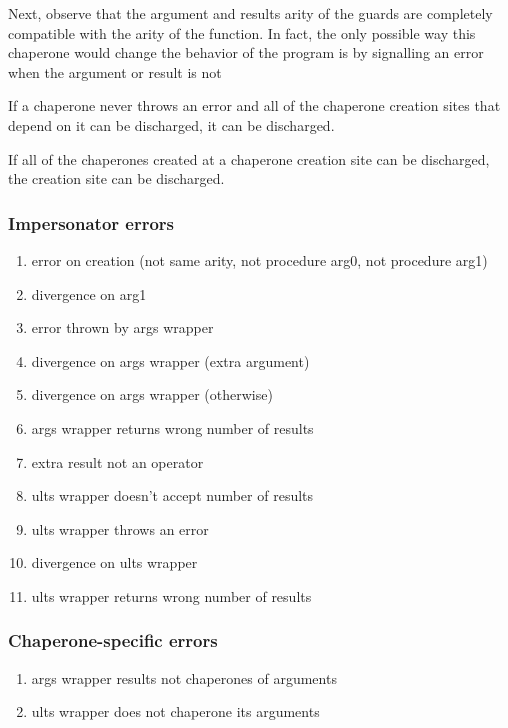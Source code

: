 \documentclass{sigplanconf}
\begin{document}
Next, observe that the argument and results arity of the guards are completely compatible with the arity of the function.
In fact, the only possible way this chaperone would change the behavior of the program is by signalling an error when the argument or result is not 

If a chaperone never throws an error and all of the chaperone creation sites that depend on it can be discharged, it can be discharged.

If all of the chaperones created at a chaperone creation site can be discharged, the creation site can be discharged.


\subsubsection{Impersonator errors}
\begin{enumerate}
\item error on creation (not same arity, not procedure arg0, not procedure arg1)
\item divergence on arg1
\item error thrown by args wrapper
\item divergence on args wrapper (extra argument)
\item divergence on args wrapper (otherwise)
\item args wrapper returns wrong number of results
\item extra result not an operator
\item ults wrapper doesn't accept number of results
\item ults wrapper throws an error
\item divergence on ults wrapper
\item ults wrapper returns wrong number of results
\end{enumerate}

\subsubsection{Chaperone-specific errors}
\begin{enumerate}
\item args wrapper results not chaperones of arguments
\item ults wrapper does not chaperone its arguments
\end{enumerate}
\end{document}
